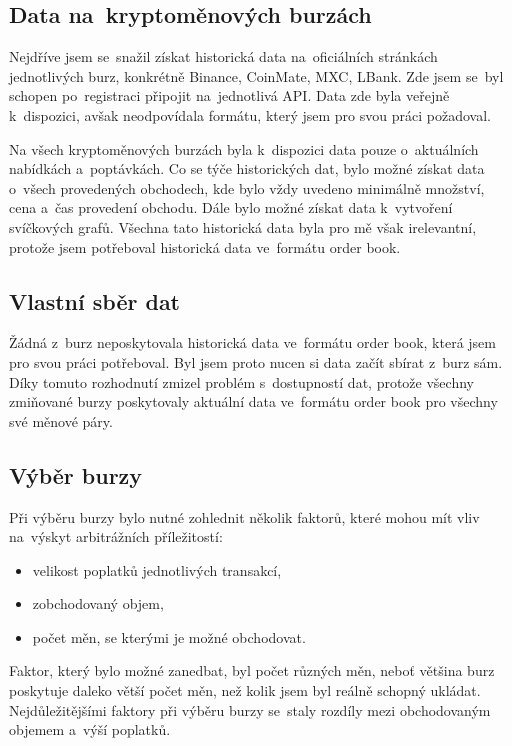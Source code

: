 \documentclass[thesis=B,czech]{FITthesis}[2019/03/21]
\begin{document}
\subsection{Data na~kryptoměnových burzách}
Nejdříve jsem se~snažil získat historická data na~oficiálních stránkách jednotlivých burz, konkrétně Binance, CoinMate, MXC, LBank. Zde jsem se~byl schopen po~registraci připojit na~jednotlivá API. Data zde byla veřejně k~dispozici, avšak neodpovídala formátu, který jsem pro svou práci požadoval. 

Na všech kryptoměnových burzách byla k~dispozici data pouze o~aktuálních nabídkách a~poptávkách. Co se týče historických dat, bylo možné získat data o~všech provedených obchodech, kde bylo vždy uvedeno minimálně množství, cena a~čas provedení obchodu. Dále bylo možné získat data k~vytvoření svíčkových grafů. Všechna tato historická data byla pro mě však irelevantní, protože jsem potřeboval historická data ve~formátu order book. \cite{BinanceApi, BitForexApi, LBankApi, CoinMateApi, MXCApi}

\subsection{Vlastní sběr dat}
Žádná z~burz neposkytovala historická data ve~formátu order book, která jsem pro svou práci potřeboval. Byl jsem proto nucen si data začít sbírat z~burz sám. Díky tomuto rozhodnutí zmizel problém s~dostupností dat, protože všechny zmiňované burzy poskytovaly aktuální data ve~formátu order book pro všechny své měnové páry.

\subsection{Výběr burzy}
Při výběru burzy bylo nutné zohlednit několik faktorů, které mohou mít vliv na~výskyt arbitrážních příležitostí: 
\begin{itemize}
    \item velikost poplatků jednotlivých transakcí,
    \item zobchodovaný objem,
    \item počet měn, se kterými je možné obchodovat.
\end{itemize}
Faktor, který bylo možné zanedbat, byl počet různých měn, neboť většina burz poskytuje daleko větší počet měn, než kolik jsem byl reálně schopný ukládat. Nejdůležitějšími faktory při výběru burzy se~staly rozdíly mezi obchodovaným objemem a~výší poplatků.
\end{document}
